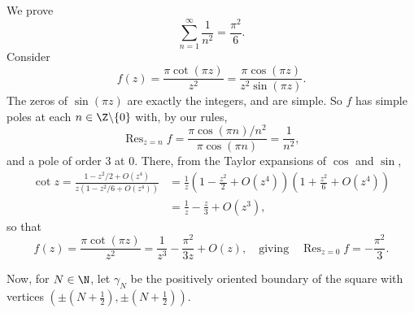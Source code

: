 \begin{example}
    We prove
    $$
    \sum_{n = 1}^{\infty} \frac{1}{n^2} = \frac{\pi^2}{6}.
    $$
    Consider
    $$
    f(z) = \frac{\pi \cot(\pi z)}{z^2} = \frac{\pi \cos(\pi z)}{z^2 \sin(\pi z)}.
    $$
    The zeros of $\sin(\pi z)$ are exactly the integers, and are simple. So $f$ has simple poles at each $n \in \Z \backslash \{0\}$ with, by our rules,
    $$
    \operatorname{Res}_{z = n} f = \frac{\pi \cos(\pi n)/n^2}{\pi \cos(\pi n)} = \frac{1}{n^2},
    $$
    and a pole of order 3 at $0$. There, from the Taylor expansions of $\cos$ and $\sin$,
    \begin{align*}
    \cot z = \frac{1 - z^2/2 + O(z^4)}{z(1 - z^2/6 + O(z^4))} &= \frac{1}{z}\left(1 - \frac{z^2}{2} + O(z^4)\right)\left(1 + \frac{z^2}{6} + O(z^4)\right) \\
    &= \frac{1}{z} - \frac{z}{3} + O(z^3),
    \end{align*}
    so that
    $$
    f(z) = \frac{\pi \cot (\pi z)}{z^2} = \frac{1}{z^3} - \frac{\pi^2}{3z} + O(z), \quad \text{giving} \quad \operatorname{Res}_{z = 0} f = -\frac{\pi^2}{3}.
    $$

    Now, for $N \in \N$, let $\gamma_N$ be the positively oriented boundary of the square with vertices $(\pm(N + \tfrac{1}{2}), \pm(N + \tfrac{1}{2}))$.

    \begin{center}
    \end{center}


\end{example}
